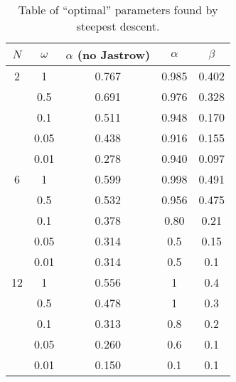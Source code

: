 \documentclass[a4paper,English,10pt]{article}
\begin{document}
\begin{table}
  \begin{center}
    \caption{Table of ``optimal'' parameters found by steepest descent.}
    \label{paramtab}
    
    \begin{tabular}{*{5}c}
      \toprule
      $N$ & $\omega$ & $\alpha$ (no Jastrow) & $\alpha$ & $\beta$ \\
      \midrule
      2 & 1 & 0.767 & 0.985 & 0.402\\
      & 0.5 & 0.691 &  0.976 &  0.328\\
      & 0.1 & 0.511 & 0.948 & 0.170\\
      & 0.05 & 0.438 & 0.916 & 0.155\\
      & 0.01 & 0.278 & 0.940 & 0.097\\
      \midrule
      6 & 1 & 0.599 &  0.998 &  0.491\\
      & 0.5 & 0.532 & 0.956 & 0.475\\
      & 0.1 & 0.378 & 0.80 & 0.21\\
      & 0.05 & 0.314 & 0.5 & 0.15\\
      & 0.01 & 0.314 & 0.5 & 0.1\\
      \midrule
      12 & 1 & 0.556 & 1 & 0.4\\
      & 0.5 & 0.478 & 1 & 0.3\\
      & 0.1 & 0.313 & 0.8 & 0.2\\
      & 0.05 & 0.260 & 0.6 & 0.1\\
      & 0.01 & 0.150 & 0.1 & 0.1\\
      \bottomrule
    \end{tabular}
    \end{center}
\end{table}
\end{document}
